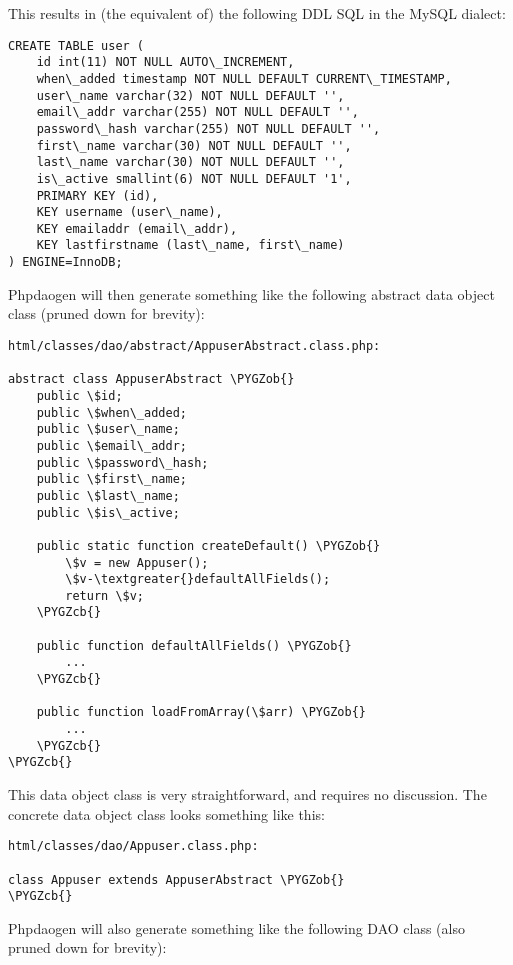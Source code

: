 \documentclass[letterpaper,10pt,english]{sphinxmanual}
\def\PYGZob{\char`\{}
\def\PYGZcb{\char`\}}
\begin{document}
This results in (the equivalent of) the following DDL SQL in the MySQL dialect:

\begin{Verbatim}[commandchars=\\\{\}]
CREATE TABLE user (
    id int(11) NOT NULL AUTO\_INCREMENT,
    when\_added timestamp NOT NULL DEFAULT CURRENT\_TIMESTAMP,
    user\_name varchar(32) NOT NULL DEFAULT '',
    email\_addr varchar(255) NOT NULL DEFAULT '',
    password\_hash varchar(255) NOT NULL DEFAULT '',
    first\_name varchar(30) NOT NULL DEFAULT '',
    last\_name varchar(30) NOT NULL DEFAULT '',
    is\_active smallint(6) NOT NULL DEFAULT '1',
    PRIMARY KEY (id),
    KEY username (user\_name),
    KEY emailaddr (email\_addr),
    KEY lastfirstname (last\_name, first\_name)
) ENGINE=InnoDB;
\end{Verbatim}

Phpdaogen will then generate something like the following abstract data object class (pruned down
for brevity):

\begin{Verbatim}[commandchars=\\\{\}]
html/classes/dao/abstract/AppuserAbstract.class.php:

abstract class AppuserAbstract \PYGZob{}
    public \$id;
    public \$when\_added;
    public \$user\_name;
    public \$email\_addr;
    public \$password\_hash;
    public \$first\_name;
    public \$last\_name;
    public \$is\_active;

    public static function createDefault() \PYGZob{}
        \$v = new Appuser();
        \$v-\textgreater{}defaultAllFields();
        return \$v;
    \PYGZcb{}

    public function defaultAllFields() \PYGZob{}
        ...
    \PYGZcb{}

    public function loadFromArray(\$arr) \PYGZob{}
        ...
    \PYGZcb{}
\PYGZcb{}
\end{Verbatim}

This data object class is very straightforward, and requires no discussion.  The concrete data object
class looks something like this:

\begin{Verbatim}[commandchars=\\\{\}]
html/classes/dao/Appuser.class.php:

class Appuser extends AppuserAbstract \PYGZob{}
\PYGZcb{}
\end{Verbatim}

Phpdaogen will also generate something like the following DAO class (also pruned down for brevity):
\end{document}
